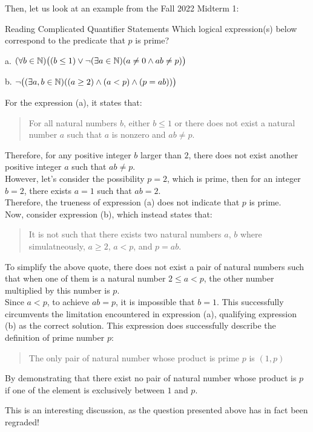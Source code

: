 Then, let us look at an example from the Fall 2022 Midterm 1:
\begin{ln-example}{Reading Complicated Quantifier Statements}{}
    Which logical expression(s) below correspond to the predicate that $p$ is prime? \\
    \begin{bindenum}
        \item[a.] $(\forall b \in \mathbb{N}) \big( (b \leq 1) \lor \neg(\exists a \in \mathbb{N})(a \neq 0 \land ab \neq p) \big)$
        \item[b.] $\neg\big( (\exists a, b \in \mathbb{N}) ((a \geq 2) \land (a < p) \land (p = ab)) \big)$
    \end{bindenum}
    \tcblower
    For the expression (a), it states that:
    \begin{quote}
        For all natural numbers $b$, either $b \leq 1$ or there does not exist a natural number $a$ such that $a$ is nonzero and $ab \neq p$. \\
    \end{quote}
    Therefore, for any positive integer $b$ larger than $2$, there does not exist another positive integer $a$ such that $ab \neq p$. \\
    However, let's consider the possibility $p = 2$, which is prime, then for an integer $b = 2$, there exists $a = 1$ such that $ab = 2$. \\
    Therefore, the trueness of expression (a) does not indicate that $p$ is prime. \\

    Now, consider expression (b), which instead states that:
    \begin{quote}
        It is not such that there exists two natural numbers $a$, $b$ where simulatneously, $a \geq 2$, $a < p$, and $p = ab$.
    \end{quote}
    To simplify the above quote, there does not exist a pair of natural numbers such that when one of them is a natural number $2 \leq a < p$, the other number multiplied by this number is $p$. \\
    Since $a < p$, to achieve $ab = p$, it is impossible that $b = 1$. This successfully circumvents the limitation encountered in expression (a), qualifying expression (b) as the correct solution. This expression does successfully describe the definition of prime number $p$:
    \begin{quote}
        The only pair of natural number whose product is prime $p$ is $(1, p)$
    \end{quote}
    By demonstrating that there exist no pair of natural number whose product is $p$ if one of the element is exclusively between $1$ and $p$.
\end{ln-example}
This is an interesting discussion, as the question presented above has in fact been regraded!

